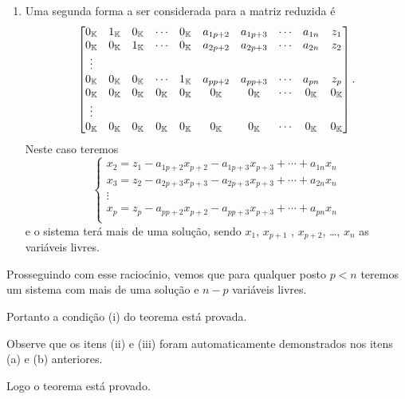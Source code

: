 \begin{prova}
\begin{enumerate}
\begin{enumerate}
\[\begin{cases}
				x_2 = z_2 - a_{2 p + 1}x_{p + 1} - a_{2 p + 2}x_{p + 2} + \cdots + a_{2n}x_{n}\\
				\vdots\\
				x_p = z_p - a_{p p + 1}x_{p + 1} - a_{p p + 2}x_{p + 2} + \cdots + a_{pn}x_{n}\\
			\end{cases}
		\]
		e o sistema ter\'a mais de uma solu\c{c}\~ao, sendo $x_{p + 1}$ , $x_{p + 2}$, \dots, $x_n$ as vari\'aveis livres.
		\item Uma segunda forma a ser considerada para a matriz reduzida \'e
		\[
			\begin{bmatrix}
				0_{\mathbb{K}} & 1_{\mathbb{K}} & 0_{\mathbb{K}} & \cdots & 0_{\mathbb{K}} & a_{1p+2} & a_{1p+3} & \cdots & a_{1n} & z_1\\
				0_{\mathbb{K}} & 0_{\mathbb{K}} & 1_{\mathbb{K}} & \cdots & 0_{\mathbb{K}} & a_{2p+2} & a_{2p+3} & \cdots & a_{2n} & z_2\\
				\vdots\\
				0_{\mathbb{K}} & 0_{\mathbb{K}} & 0_{\mathbb{K}} & \cdots & 1_{\mathbb{K}} & a_{pp+2} & a_{pp+3} & \cdots & a_{pn} & z_p\\
				0_{\mathbb{K}} & 0_{\mathbb{K}} & 0_{\mathbb{K}} & 0_{\mathbb{K}} & 0_{\mathbb{K}} & 0_{\mathbb{K}} & 0_{\mathbb{K}} & \cdots & 0_{\mathbb{K}} & 0_{\mathbb{K}}\\
				\vdots\\
				0_{\mathbb{K}} & 0_{\mathbb{K}} & 0_{\mathbb{K}} & 0_{\mathbb{K}} & 0_{\mathbb{K}} & 0_{\mathbb{K}} & 0_{\mathbb{K}} & \cdots & 0_{\mathbb{K}}  & 0_{\mathbb{K}}
			\end{bmatrix}.
		\]
		Neste caso teremos
		\[
			\begin{cases}
				x_2 = z_1 - a_{1 p + 2}x_{p + 2} - a_{1 p + 3}x_{p + 3} + \cdots + a_{1n}x_{n}\\
				x_3 = z_2 - a_{2 p + 3}x_{p + 3} - a_{2 p + 3}x_{p + 3} + \cdots + a_{2n}x_{n}\\
				\vdots\\
				x_p = z_p - a_{p p + 2}x_{p + 2} - a_{p p + 3}x_{p + 3} + \cdots + a_{pn}x_{n}\\
			\end{cases}
		\]
		e o sistema ter\'a mais de uma solu\c{c}\~ao, sendo $x_1$, $x_{p + 1}$ , $x_{p + 2}$, \dots, $x_n$ as vari\'aveis livres.
		\end{enumerate}
		Prosseguindo com esse racioc{\'\i}nio, vemos que para qualquer posto $p < n$ teremos um sistema com mais de uma solu\c{c}\~ao e $n - p$ vari\'aveis livres.
	\end{enumerate}
	Portanto a condi\c{c}\~ao (i) do teorema est\'a provada.

	Observe que os itens (ii) e (iii) foram automaticamente demonstrados nos itens (a) e (b) anteriores.

	Logo o teorema est\'a provado.
\end{prova}

